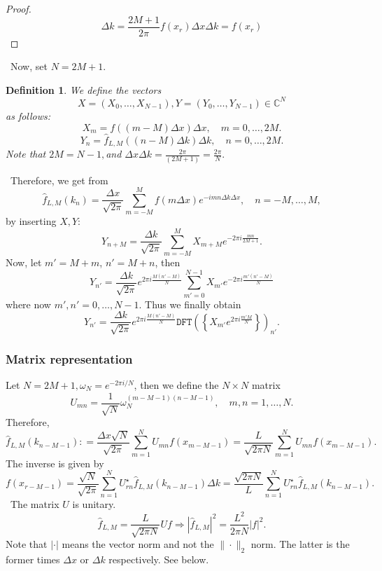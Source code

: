 \documentclass[12pt,a4paper]{article}
\newtheorem{definition}{Definition}
\begin{document}
\begin{appendices}
\begin{proof}
\[     \Delta k = \frac{2 M + 1}{2 \pi} f (x_r) \Delta x \Delta k =
      f (x_r) \]
\end{proof}
\
Now, set $N = 2 M + 1.$
\begin{definition}
  We define the vectors 
  \[X = (X_0, \ldots, X_{N - 1}), Y = (Y_0, \ldots, Y_{N
  - 1}) \in \mathbb{C}^N
  \] 
  as follows:
  \[ X_m = f ((m - M) \Delta x) \Delta x, \hspace{1em} m = 0, \ldots, 2 M. \]
  \[ Y_n = \hat{f}_{L, M} ((n - M) \Delta k) \Delta k, \hspace{1em} n = 0,
     \ldots, 2 M. \]
  Note that $2 M = N - 1,$and $\Delta x \Delta k = \frac{2 \pi}{(2 M + 1)} =
  \frac{2 \pi}{N} .$
\end{definition}
\
Therefore, we get from
\[ \hat{f}_{L, M} (k_n) = \frac{\Delta x}{\sqrt{2 \pi}}  \sum_{m = - M}^M f (m
   \Delta x) e^{- imn \Delta k \Delta x}, \hspace{1em} n = - M, \ldots, M, \]
by inserting $X, Y :$
\[ Y_{n + M} = \frac{\Delta k}{\sqrt{2 \pi}}  \sum_{m = - M}^M X_{m + M} e^{-
   2 \pi i \frac{mn}{2 M + 1}} . \]
Now, let $m' = M + m$, $n' = M + n$, then
\[ Y_{n'} = \frac{\Delta k}{\sqrt{2 \pi}} e^{2 \pi i \frac{M (n' - M)}{N}} 
   \sum_{m' = 0}^{N - 1} X_{m'} e^{- 2 \pi i \frac{m'  (n' - M)}{N}} \]
where now $m', n' = 0, \ldots, N - 1.$ Thus we finally obtain
\[ Y_{n'} = \frac{\Delta k}{\sqrt{2 \pi}} e^{2 \pi i \frac{M (n' - M)}{N}} 
   \mathtt{DFT} \left( \left\{ X_{m'} e^{2 \pi i \frac{m' M}{N}} \right\}
   \right)_{n'} . \]
\subsubsection{Matrix representation}\label{MATREP}
Let $N = 2 M + 1, \omega_N = e^{- 2 \pi i / N}$, then we define the $N \times
N$ matrix
\[ U_{m n} = \frac{1}{\sqrt{N}} \omega_N^{(m - M - 1)  (n - M - 1)},
   \hspace{1em} m, n = 1, \ldots, N. \]
Therefore,
\[ \hat{f}_{L, M} (k_{n - M - 1}) : = \frac{\Delta x \sqrt{N}}{\sqrt{2 \pi}} 
   \sum_{m = 1}^N U_{m n} f (x_{m - M - 1}) = \frac{L}{\sqrt{2 \pi N}} 
   \sum_{m = 1}^N U_{m n} f (x_{m - M - 1}) . \]
The inverse is given by
\[ f (x_{r - M - 1}) = \frac{\sqrt{N}}{\sqrt{2 \pi}}  \sum_{n = 1}^N U_{r
   n}^{\star} \hat{f}_{L, M} (k_{n - M - 1}) \Delta k = \frac{\sqrt{2 \pi
   N}}{L}  \sum_{n = 1}^N U_{r n}^{\star} \hat{f}_{L, M} (k_{n - M - 1}) . \]
\
The matrix $U$ is unitary.
\[ \hat{f}_{L, M} = \frac{L}{\sqrt{2 \pi N}} U f \Rightarrow | \hat{f}_{L, M}
   |^2 = \frac{L^2}{2 \pi N} | f |^2 . \]
Note that $| \cdot |$ means the vector norm and not the $\| \cdot \|_2$ norm.
The latter is the former times $\Delta x$ or $\Delta k$ respectively. See
below.
\

\end{appendices}
\end{document}

